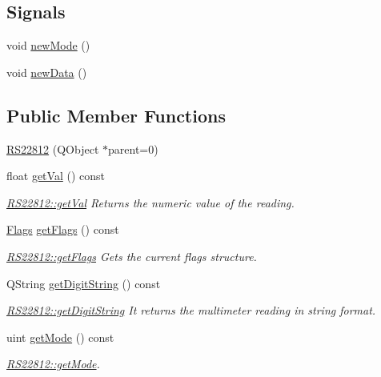 \subsection*{Signals}
\begin{DoxyCompactItemize}
\item 
void \hyperlink{class_r_s22812_a47691c122c8ad0716dc7c86b1bf01bb8}{new\-Mode} ()
\item 
void \hyperlink{class_r_s22812_afdbd28cc7f8abb95f13ad9d795c6c10d}{new\-Data} ()
\end{DoxyCompactItemize}
\subsection*{Public Member Functions}
\begin{DoxyCompactItemize}
\item 
\hyperlink{class_r_s22812_ac5e60fb0fe61e2be5db4d5caab46c827}{R\-S22812} (Q\-Object $\ast$parent=0)
\item 
float \hyperlink{class_r_s22812_a80e53a20cbe5c9c670e8b8309d043475}{get\-Val} () const 
\begin{DoxyCompactList}\small\item\em \hyperlink{class_r_s22812_a80e53a20cbe5c9c670e8b8309d043475}{R\-S22812\-::get\-Val} Returns the numeric value of the reading. \end{DoxyCompactList}\item 
\hyperlink{struct_flags}{Flags} \hyperlink{class_r_s22812_a4ae945cdd647a66f6e7d54f20f77502e}{get\-Flags} () const 
\begin{DoxyCompactList}\small\item\em \hyperlink{class_r_s22812_a4ae945cdd647a66f6e7d54f20f77502e}{R\-S22812\-::get\-Flags} Gets the current flags structure. \end{DoxyCompactList}\item 
Q\-String \hyperlink{class_r_s22812_aee09c692d82aacb68a598091ea4b6597}{get\-Digit\-String} () const 
\begin{DoxyCompactList}\small\item\em \hyperlink{class_r_s22812_aee09c692d82aacb68a598091ea4b6597}{R\-S22812\-::get\-Digit\-String} It returns the multimeter reading in string format. \end{DoxyCompactList}\item 
uint \hyperlink{class_r_s22812_a72884c3f25b59129ac21dca9f68a664f}{get\-Mode} () const 
\begin{DoxyCompactList}\small\item\em \hyperlink{class_r_s22812_a72884c3f25b59129ac21dca9f68a664f}{R\-S22812\-::get\-Mode}. \end{DoxyCompactList}\end{DoxyCompactItemize}

